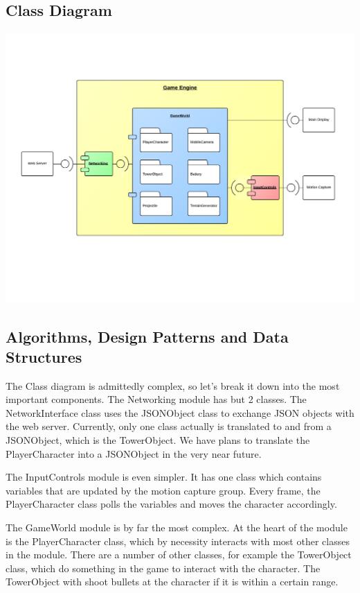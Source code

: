\documentclass[10pt,letterpaper,oneside,english]{article}
\begin{document}
\subsection{Class Diagram}
\includegraphics[scale= 0.7]{ComponentDiagram}

\subsection{Algorithms, Design Patterns and Data Structures}
The Class diagram is admittedly complex, so let’s break it down into the most important components. The Networking module has but 2 classes. The NetworkInterface class uses the JSONObject class to exchange JSON objects with the web server. Currently, only one class actually is translated to and from a JSONObject, which is the TowerObject. We have plans to translate the PlayerCharacter into a JSONObject in the very near future.

The InputControls module is even simpler. It has one class which contains variables that are updated by the motion capture group. Every frame, the PlayerCharacter class polls the variables and moves the character accordingly.

The GameWorld module is by far the most complex. At the heart of the module is the PlayerCharacter class, which by necessity interacts with most other classes in the module. There are a number of other classes, for example the TowerObject class, which do something in the game to interact with the character. The TowerObject with shoot bullets at the character if it is within a certain range.
\end{document}
